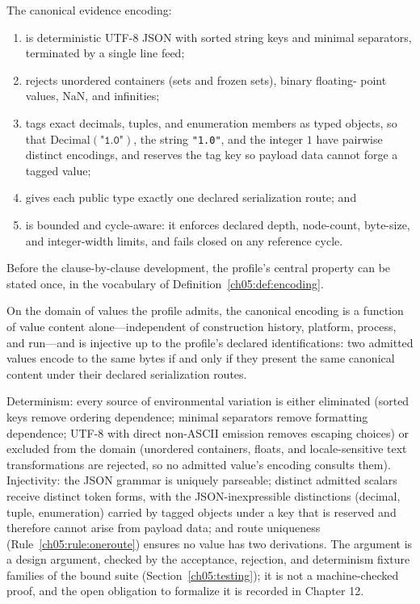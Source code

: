 \begin{ruleenv}\label{ch05:rule:master}
The canonical evidence encoding:
\begin{enumerate}
\item is deterministic UTF-8 JSON with sorted string keys and minimal
separators, terminated by a single line feed;
\item rejects unordered containers (sets and frozen sets), binary floating-
point values, NaN, and infinities;
\item tags exact decimals, tuples, and enumeration members as typed objects,
so that $\mathrm{Decimal}(\texttt{"1.0"})$, the string \texttt{"1.0"}, and
the integer $1$ have pairwise distinct encodings, and reserves the tag key
so payload data cannot forge a tagged value;
\item gives each public type exactly one declared serialization route; and
\item is bounded and cycle-aware: it enforces declared depth, node-count,
byte-size, and integer-width limits, and fails closed on any reference
cycle.
\end{enumerate}
\end{ruleenv}

Before the clause-by-clause development, the profile's central property
can be stated once, in the vocabulary of
Definition~\ref{ch05:def:encoding}.

\begin{proposition}
\label{ch05:prop:injective}
On the domain of values the profile admits, the canonical encoding is a
function of value content alone---independent of construction history,
platform, process, and run---and is injective up to the profile's
declared identifications: two admitted values encode to the same bytes
if and only if they present the same canonical content under their
declared serialization routes.
\end{proposition}

\begin{designargument}
Determinism: every source of environmental variation is either
eliminated (sorted keys remove ordering dependence; minimal separators
remove formatting dependence; UTF-8 with direct non-ASCII emission
removes escaping choices) or excluded from the domain (unordered
containers, floats, and locale-sensitive text transformations are
rejected, so no admitted value's encoding consults them). Injectivity:
the JSON grammar is uniquely parseable; distinct admitted scalars
receive distinct token forms, with the JSON-inexpressible distinctions
(decimal, tuple, enumeration) carried by tagged objects under a key that
is reserved and therefore cannot arise from payload data; and route
uniqueness (Rule~\ref{ch05:rule:oneroute}) ensures no value has two
derivations. The argument is a design argument, checked by the
acceptance, rejection, and determinism fixture families of the bound
suite (Section~\ref{ch05:testing}); it is not a machine-checked proof,
and the open obligation to formalize it is recorded in Chapter 12.
\end{designargument}

